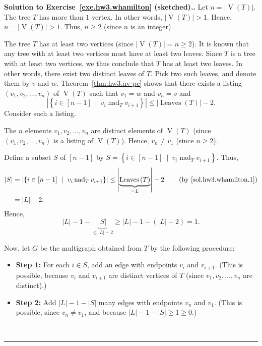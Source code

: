 \documentclass[numbers=enddot,12pt,final,onecolumn,notitlepage]{scrartcl}%
\theoremstyle{definition}
\newtheorem{coro}[theo]{Corollary}
\newenvironment{corollary}[1][]
{\begin{coro}[#1]\begin{leftbar}}
{\end{leftbar}\end{coro}}
\newenvironment{proof}[1][Proof]{\noindent\textbf{#1.} }{\ \rule{0.5em}{0.5em}}
\newcommand{\set}[1]{\left\{ #1 \right\}}
\newcommand{\abs}[1]{\left| #1 \right|}
\newcommand{\tup}[1]{\left( #1 \right)}
\newcommand{\ive}[1]{\left[ #1 \right]}
\newcommand{\verts}[1]{\operatorname{V}\left( #1 \right)}
\newcommand{\leaves}[1]{\operatorname{Leaves}\left( #1 \right)}
\begin{document}

\begin{proof}[Solution to Exercise~\ref{exe.hw3.whamilton}
(sketched).]
Let $n = \abs{\verts{T}}$.
The tree $T$ has more than $1$ vertex.
In other words, $\abs{\verts{T}} > 1$.
Hence, $n = \abs{\verts{T}} > 1$.
Thus, $n \geq 2$ (since $n$ is an integer).

The tree $T$ has at least two vertices (since
$\abs{\verts{T}} = n \geq 2$).
It is known that any tree with at least two vertices must
have at least two leaves.
Since $T$ is a tree with at least two vertices, we thus
conclude that $T$ has at least two leaves.
In other words, there exist two distinct leaves of $T$.
Pick two such leaves, and denote them by $v$ and $w$.
Theorem~\ref{thm.hw3.uv-pc} shows that there exists a listing
$\tup{v_1, v_2, \ldots, v_n}$ of
$\verts{T}$ such that $v_1 = w$ and $v_n = v$ and
\begin{equation}
\abs{\set{i \in \ive{n-1} \ \mid \ v_i \operatorname{nad}_T v_{i+1} }}
\leq \abs{\leaves{T}} - 2.
\label{sol.hw3.whamilton.1}
\end{equation}
Consider such a listing.

The $n$ elements $v_1, v_2, \ldots, v_n$ are distinct elements of
$\verts{T}$ (since $\tup{v_1, v_2, \ldots, v_n}$ is a listing of
$\verts{T}$).
Hence, $v_n \neq v_1$ (since $n \geq 2$).

Define a subset $S$ of $\ive{n-1}$ by
$S = \set{i \in \ive{n-1} \ \mid \ v_i \operatorname{nad}_T v_{i+1} }$.
Thus,
\begin{align*}
\abs{S}
&= \abs{\set{i \in \ive{n-1} \ \mid \ v_i \operatorname{nad}_T v_{i+1} }}
\leq \abs{\underbrace{\leaves{T}}_{= L}} - 2
\qquad \left(\text{by \eqref{sol.hw3.whamilton.1}}\right) \\
&= \abs{L} - 2 .
\end{align*}
Hence,
\[
\abs{L} - 1 - \underbrace{\abs{S}}_{\leq \abs{L} - 2}
\geq \abs{L} - 1 - \tup{\abs{L} - 2} = 1 .
\]

Now, let $G$ be the multigraph obtained from $T$ by the following
procedure:
\begin{itemize}
\item \textbf{Step 1:}
      For each $i \in S$, add an edge with endpoints $v_i$ and
      $v_{i+1}$.
      (This is possible, because $v_i$ and $v_{i+1}$ are distinct
      vertices of $T$ (since $v_1, v_2, \ldots, v_n$ are distinct).)
\item \textbf{Step 2:}
      Add $\abs{L} - 1 - \abs{S}$ many edges with endpoints $v_n$
      and $v_1$.
      (This is possible, since $v_n \neq v_1$, and because
      $\abs{L} - 1 - \abs{S} \geq 1 \geq 0$.)
\end{itemize}


\end{proof}
\end{document}
